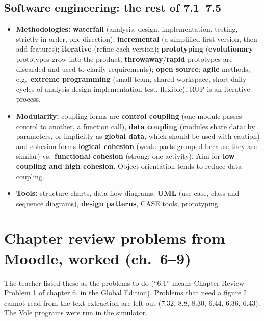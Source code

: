\documentclass{fkt-notes}
\begin{document}
\subsection{Software engineering: the rest of 7.1--7.5}
\begin{itemize}[nosep]
  \item \textbf{Methodologies:} \textbf{waterfall} (analysis, design, implementation, testing, strictly in order, one direction); \textbf{incremental} (a simplified first version,
        then add features); \textbf{iterative} (refine each version); \textbf{prototyping} (\textbf{evolutionary} prototypes grow into the product, \textbf{throwaway}/\textbf{rapid}
        prototypes are discarded and used to clarify requirements); \textbf{open source}; \textbf{agile} methods, e.g.\ \textbf{extreme programming} (small team, shared workspace,
        short daily cycles of analysis-design-implementation-test, flexible). RUP is an iterative process.
  \item \textbf{Modularity:} coupling forms are \textbf{control coupling} (one module passes control to another, a function call), \textbf{data coupling} (modules share data: by
        parameters, or implicitly as \textbf{global data}, which should be used with caution) and cohesion forms \textbf{logical cohesion} (weak: parts grouped because they are similar)
        vs.\ \textbf{functional cohesion} (strong: one activity). Aim for \textbf{low coupling and high cohesion}. Object orientation tends to reduce data coupling.
  \item \textbf{Tools:} structure charts, data flow diagrams, \textbf{UML} (use case, class and sequence diagrams), \textbf{design patterns}, CASE tools, prototyping.
\end{itemize}

\newpage
\section{Chapter review problems from Moodle, worked (ch.~6--9)}
The teacher listed these as the problems to do (``6.1'' means Chapter Review Problem 1 of chapter 6, in the Global Edition). Problems that need a figure
I cannot read from the text extraction are left out (7.32, 8.8, 8.30, 6.44, 6.36, 6.43). The Vole programs were run in the simulator.
\end{document}
